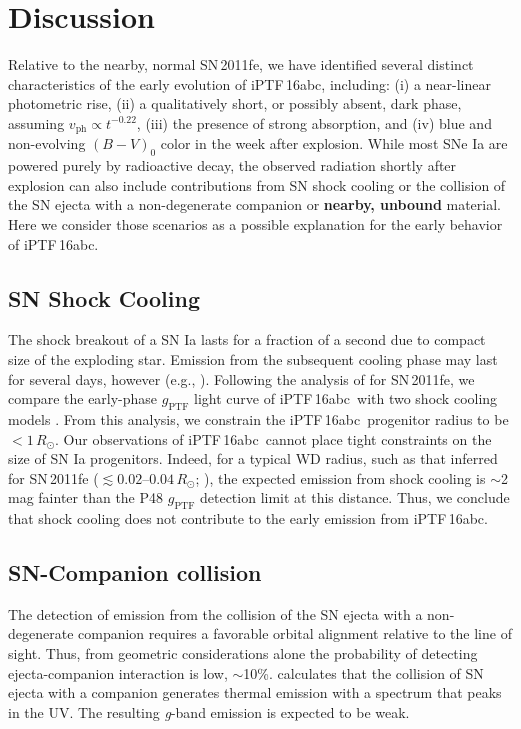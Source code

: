\documentclass[twocolumn]{aastex61}
\newcommand{\sr}{R_\odot}
\newcommand{\abc}{iPTF\,16abc}
\begin{document}
\section{Discussion}
\label{sec:lc_energy}

Relative to the nearby, normal SN\,2011fe, we have identified several distinct characteristics of the early evolution of \abc, including: (i) a near-linear photometric rise, (ii) a qualitatively short, or possibly absent, dark phase, assuming $v_\mathrm{ph} \propto t^{-0.22}$, (iii) the presence of strong  absorption, and (iv) blue and non-evolving $(B - V)_0$ color in the week after explosion. While most SNe Ia are powered purely by radioactive decay, the observed radiation shortly after explosion can also include contributions 
from SN shock cooling or the collision of the SN ejecta with a non-degenerate companion or \textbf{nearby, unbound} material. Here we consider those scenarios as a possible explanation for the early behavior of \abc. 

\subsection{SN Shock Cooling}

The shock breakout of a SN Ia lasts for a fraction of a second due to
compact size of the exploding star. Emission from the subsequent 
cooling phase may last for several days, however (e.g., 
\citealt{2010ApJ...708..598P}). Following the analysis of \citet{2012ApJ...744L..17B} for SN\,2011fe, we
compare the early-phase $g_\mathrm{PTF}$ light curve of \abc\ with
two shock cooling models \citep{2011ApJ...728...63R, 
2010ApJ...708..598P}. From this analysis, we constrain the \abc\ 
progenitor radius to be $<1\,\sr$. Our observations of \abc\ cannot 
place tight constraints on the size of SN Ia progenitors. Indeed, 
for a typical WD radius, such as that inferred for SN\,2011fe 
($\lesssim 0.02$--$0.04\,\sr$; \citealt{2012ApJ...744L..17B, 
2014ApJ...784...85P}), the expected emission from shock cooling is 
$\sim$2 mag fainter than the P48 $g_\mathrm{PTF}$ detection limit at this distance. 
Thus, we conclude that shock cooling does not contribute to the 
early emission from \abc.

\subsection{SN-Companion collision}
\label{sec:companion}

The detection of emission from the collision of the SN ejecta 
with a non-degenerate companion requires a favorable orbital 
alignment relative to the line of sight. Thus, from geometric 
considerations alone the probability of detecting ejecta-companion 
interaction is low, $\sim$10\%. \citet{2010ApJ...708.1025K} 
calculates that the collision of SN ejecta with a companion  
generates thermal emission with a spectrum that peaks in the 
UV. The resulting \textit{g}-band emission is expected to be weak.
\end{document}
